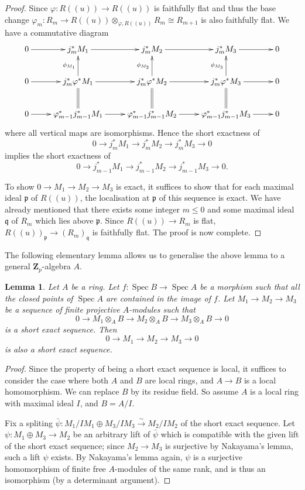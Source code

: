 \documentclass[11pt]{amsart}
\newtheorem{lem}{Lemma}
\numberwithin{thm}{section}
\numberwithin{lem}{section}
\numberwithin{cor}{section}
\numberwithin{prop}{section}
\numberwithin{exam}{section}
\numberwithin{dfn}{section}
\newcommand{\spec}{\operatorname{Spec}}
\newcommand{\fp}{\mathfrak{p}}
\newcommand{\fq}{\mathfrak{q}}
\newcommand{\Z}{\mathbf{Z}}
\begin{document}
\begin{appendices}
\begin{proof}
Since $\varphi: R(\!(u)\!)\to R(\!(u)\!)$ is faithfully flat and thus
the base change $\varphi_m: R_m\to R(\!(u)\!)\otimes_{\varphi,R(\!(u)\!)}R_m
\cong R_{m+1}$ is also faithfully flat.
We have a commutative diagram
$$
\xymatrix{
    0 \ar[r] & j_m^* M_1 \ar[r] &
    j_m^* M_2 \ar[r] &
    j_m^* M_3 \ar[r] & 0\\
    0 \ar[r] & j_m^* \varphi^*M_1 \ar[r]\ar[u]^{\phi_{M_1}}\ar@{=}[d] &
    j_m^* \varphi^*M_2 \ar[r]\ar@{=}[d]\ar[u]^{\phi_{M_2}} &
    j_m^* \varphi^*M_3 \ar[r]\ar@{=}[d]\ar[u]^{\phi_{M_3}} & 0 \\
    0 \ar[r] & \varphi_{m-1}^*j_{m-1}^* M_1 \ar[r] &
    \varphi_{m-1}^*j_{m-1}^*M_2 \ar[r] &
    \varphi_{m-1}^*j_{m-1}^*M_3 \ar[r] & 0
}
$$
where all vertical maps are isomorphisms.
Hence the short exactness of 
$$0\to j_m^*M_{1}\to j_m^*M_{2}\to j_m^*M_{3}\to 0$$
implies the short exactness of
$$0\to j_{m-1}^*M_{1}\to j_{m-1}^*M_{2}\to j_{m-1}^*M_{3}\to 0.$$

To show $0\to M_1\to M_2\to M_3$ is exact,
it suffices to show that for each maximal ideal $\fp$
of $R(\!(u)\!)$, the localisation at $\mathfrak {p}$ of this sequence is exact.
We have already mentioned that there exists some integer $m\le 0$
and some maximal ideal $\fq$ of $R_{m}$ which
lies above $\fp$.
Since $R(\!(u)\!)\to R_{m}$ is flat,
$R(\!(u)\!)_{\fp}\to (R_m)_{\fq}$ is faithfully flat.
The proof is now complete.
\end{proof}

The following elementary lemma allows us to generalise the above lemma
to a general $\Z_p$-algebra $A$.

\begin{lem}
\label{lem-eff2}
Let $A$ be a ring.
Let $f: \spec B\to \spec A$ be a morphism such that
all the closed points of $\spec A$ are contained in the image of $f$.
Let $M_1\to M_2\to M_3$ be a sequence of finite projective $A$-modules
such that $$0\to M_1\otimes_AB\to M_2\otimes_AB\to M_3\otimes_AB\to 0$$ is
a short exact sequence.
Then $$0\to M_1\to M_2\to M_3\to 0$$ is also a short exact sequence.
\end{lem}

\begin{proof}
Since the property of being a short exact sequence is local,
it suffices to consider the case where both $A$ and $B$ are local rings,
and $A\to B$ is a local homomorphism.
We can replace $B$ by its residue field.
So assume $A$ is a local ring
with maximal ideal $I$, and
$B=A/I$.

Fix a spliting
$\bar\psi:M_1/IM_1 \oplus M_3/IM_3\xrightarrow{\sim} M_2/IM_2$
of the short exact sequence.
Let $\psi:M_1\oplus M_3 \to M_2$ be an arbitrary lift of $\bar\psi$
which is compatible with the given lift of the short exact sequence;
since $M_2\to M_3$ is surjective by Nakayama's lemma,
such a lift $\psi$ exists.
By Nakayama's lemma again,
$\psi$ is a surjective homomorphism of finite free $A$-modules
of the same rank,
and is thus an isomorphism (by a determinant argument).
\end{proof}


\end{appendices}
\end{document}
